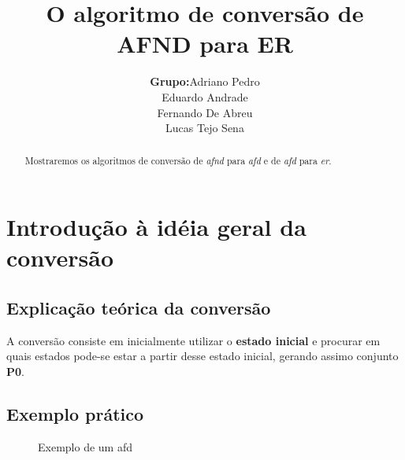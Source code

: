 \documentclass[a4paper,10pt]{article} %
\title{O algoritmo de conversão de AFND para ER}
\author{
    \begin{tabular}{ll}
        \textbf{Grupo:} &
        Adriano Pedro \tabularnewline &
        Eduardo Andrade\tabularnewline &
        Fernando De Abreu\tabularnewline &
        Lucas Tejo Sena\tabularnewline
    \end{tabular}
}
\begin{document}
\maketitle

\begin{abstract}

Mostraremos os algoritmos de conversão de \textit{afnd} para \textit{afd} e de \textit{afd} para \textit{er}.

\end{abstract}


\section{Introdução à idéia geral da conversão}
\subsection{Explicação teórica da conversão}
A conversão consiste em inicialmente utilizar o \textbf{estado inicial}
e procurar em quais estados pode-se estar a partir desse estado inicial, 
gerando assimo conjunto \textbf{P0}.

\subsection{Exemplo prático}
\begin{figure}[H]%
     \centering %
      \caption{Exemplo de um afd}
      \label{fig:my_label}
\end{figure}          
\end{document}

